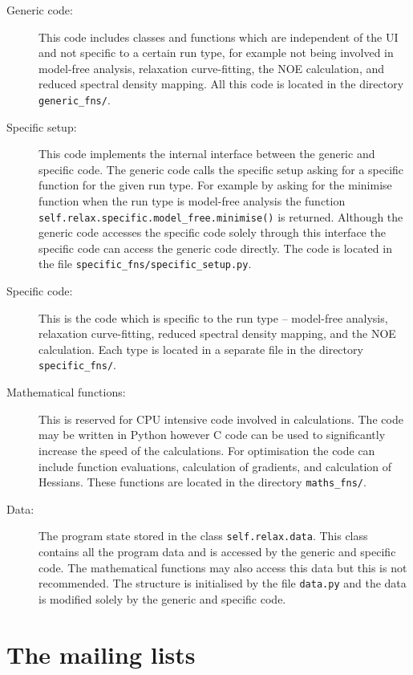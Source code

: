 \begin{description}
\item[Generic code:]  This code includes classes and functions which are independent of the UI and not specific to a certain run type, for example not being involved in model-free analysis, relaxation curve-fitting, the NOE calculation, and reduced spectral density mapping.  All this code is located in the directory \texttt{generic\_fns/}.

\item[Specific setup:]  This code implements the internal interface between the generic and specific code.  The generic code calls the specific setup asking for a specific function for the given run type.  For example by asking for the minimise function when the run type is model-free analysis the function \texttt{self.rel\-ax.spec\-if\-ic.mod\-el\_free.min\-im\-ise()} is returned.  Although the generic code accesses the specific code solely through this interface the specific code can access the generic code directly.  The code is located in the file \texttt{specific\_fns/specific\_setup.py}.

\item[Specific code:]  This is the code which is specific to the run type -- model-free analysis, relaxation curve-fitting, reduced spectral density mapping, and the NOE calculation.  Each type is located in a separate file in the directory \texttt{specific\_fns/}.

\item[Mathematical functions:]  This is reserved for CPU intensive code involved in calculations.  The code may be written in Python however C code can be used to significantly increase the speed of the calculations.  For optimisation the code can include function evaluations, calculation of gradients, and calculation of Hessians.  These functions are located in the directory \texttt{maths\_fns/}.

\item[Data:]  The program state stored in the class \texttt{self.relax.data}.  This class contains all the program data and is accessed by the generic and specific code.  The mathematical functions may also access this data but this is not recommended.  The structure is initialised by the file \texttt{data.py} and the data is modified solely by the generic and specific code.
\end{description}





\section{The mailing lists}


